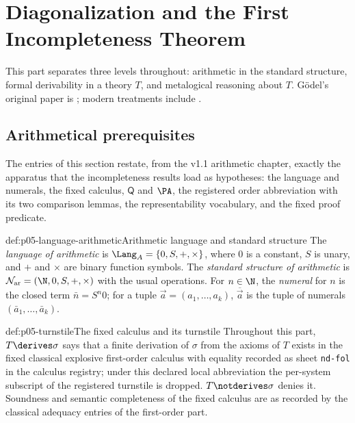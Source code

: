 \chapter{Diagonalization and the First Incompleteness Theorem}
\label{sec:p05-diagonalization}

This part separates three levels throughout: arithmetic in the standard
structure, formal derivability in a theory \(T\), and metalogical reasoning
about \(T\).  G\"odel's original paper is \cite{Godel1931}; modern
treatments include \cite{Shoenfield1967,BoolosBurgessJeffrey2007}.

\section{Arithmetical prerequisites}
\label{sec:p05-diagonalization-prereq}

The entries of this section restate, from the v1.1 arithmetic chapter,
exactly the apparatus that the incompleteness results load as hypotheses:
the language and numerals, the fixed calculus, \(\mathsf Q\) and \(\PA\),
the registered order abbreviation with its two comparison lemmas, the
representability vocabulary, and the fixed proof predicate.

\begin{hbdefinition}{def:p05-language-arithmetic}{Arithmetic language and standard structure}
The \emph{language of arithmetic} is \(\Lang_A=\{0,S,+,\times\}\), where
\(0\) is a constant, \(S\) is unary, and \(+\) and \(\times\) are binary
function symbols.  The \emph{standard structure of arithmetic} is
\(\mathcal N_{\mathrm{ar}}=(\N,0,S,+,\times)\) with the usual operations.  For
\(n\in\N\), the \emph{numeral} for \(n\) is the closed term
\(\bar n=S^n0\); for a tuple \(\vec a=(a_1,\ldots,a_k)\),
\(\overline{\vec a}\) is the tuple of numerals
\((\bar a_1,\ldots,\bar a_k)\).
\end{hbdefinition}

\begin{hbconvention}{def:p05-turnstile}{The fixed calculus and its turnstile}
Throughout this part, \(T\derives\sigma\) says that a finite derivation of
\(\sigma\) from the axioms of \(T\) exists in the fixed classical explosive
first-order calculus with equality recorded as sheet \texttt{nd-fol} in the
calculus registry; under this declared local abbreviation the per-system
subscript of the registered turnstile is dropped.  \(T\notderives\sigma\)
denies it.  Soundness and semantic completeness of the fixed calculus are
as recorded by the classical adequacy entries of the first-order part.
\end{hbconvention}


